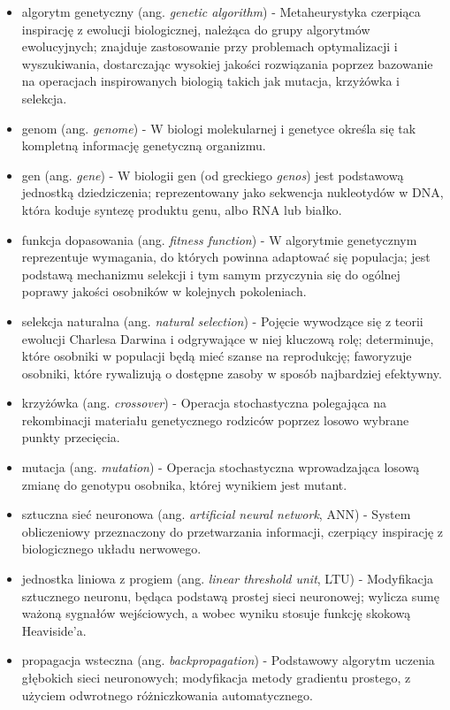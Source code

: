 \documentclass[a4paper,11pt]{article}
\begin{document}
    \begin{itemize}
        \item algorytm genetyczny (ang. \textit{genetic algorithm}) - Metaheurystyka czerpiąca inspirację z ewolucji biologicznej, należąca do grupy algorytmów ewolucyjnych; znajduje zastosowanie przy problemach optymalizacji i wyszukiwania, dostarczając wysokiej jakości rozwiązania poprzez bazowanie na operacjach inspirowanych biologią takich jak mutacja, krzyżówka i selekcja\cite{GeneticAlgorithmsMitchell1996}.
        \item genom (ang. \textit{genome}) - W biologi molekularnej i genetyce określa się tak kompletną informację genetyczną organizmu\cite{WhatIsGenomicMedicine2019}.
        \item gen (ang. \textit{gene}) - W biologii gen (od greckiego \textit{genos}) jest podstawową jednostką dziedziczenia; reprezentowany jako sekwencja nukleotydów w DNA, która koduje syntezę produktu genu, albo RNA lub białko\cite{GeneWiki}.
        \item funkcja dopasowania (ang. \textit{fitness function}) - W algorytmie genetycznym reprezentuje wymagania, do których powinna adaptować się populacja; jest podstawą mechanizmu selekcji i tym samym przyczynia się do ogólnej poprawy jakości osobników w kolejnych pokoleniach\cite{IntroductionToEvolutionaryComputing2015}.
        \item selekcja naturalna (ang. \textit{natural selection}) - Pojęcie wywodzące się z teorii ewolucji Charlesa Darwina i odgrywające w niej kluczową rolę; determinuje, które osobniki w populacji będą mieć szanse na reprodukcję; faworyzuje osobniki, które rywalizują o dostępne zasoby w sposób najbardziej efektywny\cite{IntroductionToEvolutionaryComputing2015}.
        \item krzyżówka (ang. \textit{crossover}) - Operacja stochastyczna polegająca na rekombinacji materiału genetycznego rodziców poprzez losowo wybrane punkty przecięcia\cite{IntroductionToEvolutionaryComputing2015}.
        \item mutacja (ang. \textit{mutation}) - Operacja stochastyczna wprowadzająca losową zmianę do genotypu osobnika, której wynikiem jest mutant\cite{IntroductionToEvolutionaryComputing2015}.
        \item sztuczna sieć neuronowa (ang. \textit{artificial neural network}, ANN) - System obliczeniowy przeznaczony do przetwarzania informacji, czerpiący inspirację z biologicznego układu nerwowego\cite{LeksykonSieciNeuronowych2015}.
        \item jednostka liniowa z progiem (ang. \textit{linear threshold unit}, LTU) - Modyfikacja sztucznego neuronu, będąca podstawą prostej sieci neuronowej; wylicza sumę ważoną sygnałów wejściowych, a wobec wyniku stosuje funkcję skokową Heaviside'a\cite{UczenieMaszynowe2018}.
        \item propagacja wsteczna (ang. \textit{backpropagation}) - Podstawowy algorytm uczenia głębokich sieci neuronowych; modyfikacja metody gradientu prostego, z użyciem odwrotnego różniczkowania automatycznego\cite{UczenieMaszynowe2018}.
    \end{itemize}
\end{document}
